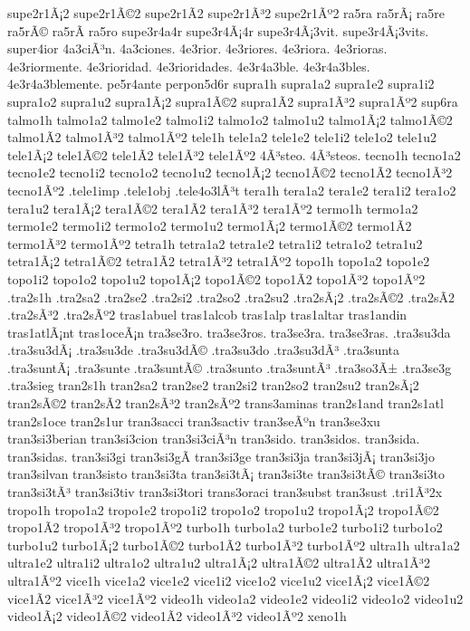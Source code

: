 {supe2r1Ã¡2 supe2r1Ã©2 supe2r1Ã­2 supe2r1Ã³2 supe2r1Ãº2
ra5ra
ra5rÃ¡
ra5re
ra5rÃ©
ra5rÃ­
ra5ro
supe3r4a4r
supe3r4Ã¡4r
supe3r4Ã¡3vit.
supe3r4Ã¡3vits.
super4ior
4a3ciÃ³n.
4a3ciones.
4e3rior.
4e3riores.
4e3riora.
4e3rioras.
4e3riormente.
4e3rioridad.
4e3rioridades.
4e3r4a3ble.
4e3r4a3bles.
4e3r4a3blemente.
pe5r4ante
perpon5d6r
supra1h
supra1a2 supra1e2 supra1i2 supra1o2 supra1u2
supra1Ã¡2 supra1Ã©2 supra1Ã­2 supra1Ã³2 supra1Ãº2
sup6ra
talmo1h
talmo1a2 talmo1e2 talmo1i2 talmo1o2 talmo1u2
talmo1Ã¡2 talmo1Ã©2 talmo1Ã­2 talmo1Ã³2 talmo1Ãº2
tele1h
tele1a2 tele1e2 tele1i2 tele1o2 tele1u2
tele1Ã¡2 tele1Ã©2 tele1Ã­2 tele1Ã³2 tele1Ãº2
4Ã³steo.
4Ã³steos.
tecno1h
tecno1a2 tecno1e2 tecno1i2 tecno1o2 tecno1u2
tecno1Ã¡2 tecno1Ã©2 tecno1Ã­2 tecno1Ã³2 tecno1Ãº2
.tele1imp
.tele1obj
.tele4o3lÃ³t
tera1h
tera1a2 tera1e2 tera1i2 tera1o2 tera1u2
tera1Ã¡2 tera1Ã©2 tera1Ã­2 tera1Ã³2 tera1Ãº2
termo1h
termo1a2 termo1e2 termo1i2 termo1o2 termo1u2
termo1Ã¡2 termo1Ã©2 termo1Ã­2 termo1Ã³2 termo1Ãº2
tetra1h
tetra1a2 tetra1e2 tetra1i2 tetra1o2 tetra1u2
tetra1Ã¡2 tetra1Ã©2 tetra1Ã­2 tetra1Ã³2 tetra1Ãº2
topo1h
topo1a2 topo1e2 topo1i2 topo1o2 topo1u2
topo1Ã¡2 topo1Ã©2 topo1Ã­2 topo1Ã³2 topo1Ãº2
.tra2s1h
.tra2sa2 .tra2se2 .tra2si2 .tra2so2 .tra2su2
.tra2sÃ¡2 .tra2sÃ©2 .tra2sÃ­2 .tra2sÃ³2 .tra2sÃº2
tras1abuel
tras1alcob
tras1alp
tras1altar
tras1andin
tras1atlÃ¡nt
tras1oceÃ¡n
tra3se3ro.
tra3se3ros.
tra3se3ra.
tra3se3ras.
.tra3su3da
.tra3su3dÃ¡
.tra3su3de
.tra3su3dÃ©
.tra3su3do
.tra3su3dÃ³
.tra3sunta
.tra3suntÃ¡
.tra3sunte
.tra3suntÃ©
.tra3sunto
.tra3suntÃ³
.tra3so3Ã±
.tra3se3g
.tra3sieg
tran2s1h
tran2sa2 tran2se2 tran2si2 tran2so2 tran2su2
tran2sÃ¡2 tran2sÃ©2 tran2sÃ­2 tran2sÃ³2 tran2sÃº2
trans3aminas
tran2s1and
tran2s1atl
tran2s1oce
tran2s1ur
tran3sacci
tran3sactiv
tran3seÃºn
tran3se3xu
tran3si3berian
tran3si3cion
tran3si3ciÃ³n
tran3sido.
tran3sidos.
tran3sida.
tran3sidas.
tran3si3gi
tran3si3gÃ­
tran3si3ge
tran3si3ja
tran3si3jÃ¡
tran3si3jo
tran3silvan
tran3sisto
tran3si3ta
tran3si3tÃ¡
tran3si3te
tran3si3tÃ©
tran3si3to
tran3si3tÃ³
tran3si3tiv
tran3si3tori
trans3oraci
tran3subst
tran3sust
.tri1Ã³2x
tropo1h
tropo1a2 tropo1e2 tropo1i2 tropo1o2 tropo1u2
tropo1Ã¡2 tropo1Ã©2 tropo1Ã­2 tropo1Ã³2 tropo1Ãº2
turbo1h
turbo1a2 turbo1e2 turbo1i2 turbo1o2 turbo1u2
turbo1Ã¡2 turbo1Ã©2 turbo1Ã­2 turbo1Ã³2 turbo1Ãº2
ultra1h
ultra1a2 ultra1e2 ultra1i2 ultra1o2 ultra1u2
ultra1Ã¡2 ultra1Ã©2 ultra1Ã­2 ultra1Ã³2 ultra1Ãº2
vice1h
vice1a2 vice1e2 vice1i2 vice1o2 vice1u2
vice1Ã¡2 vice1Ã©2 vice1Ã­2 vice1Ã³2 vice1Ãº2
video1h
video1a2 video1e2 video1i2 video1o2 video1u2
video1Ã¡2 video1Ã©2 video1Ã­2 video1Ã³2 video1Ãº2
xeno1h
}
